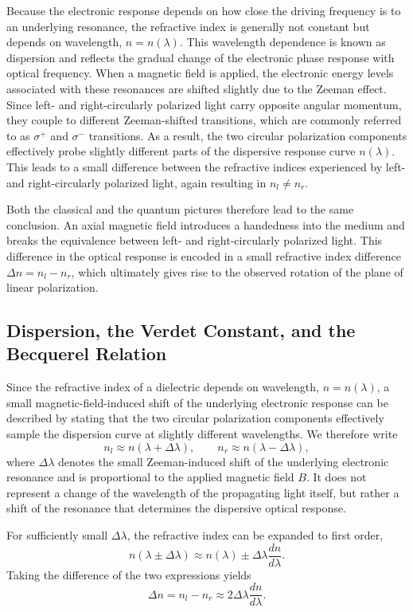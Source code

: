 \documentclass[a4paper]{article}
\begin{document}
Because the electronic response depends on how close the driving frequency is to an underlying resonance, the refractive index is generally not constant but depends on wavelength, $n = n(\lambda)$.
This wavelength dependence is known as dispersion and reflects the gradual change of the electronic phase response with optical frequency.
When a magnetic field is applied, the electronic energy levels associated with these resonances are shifted slightly due to the Zeeman effect.
Since left- and right-circularly polarized light carry opposite angular momentum, they couple to different Zeeman-shifted transitions, which are commonly referred to as $\sigma^+$ and $\sigma^-$ transitions.
As a result, the two circular polarization components effectively probe slightly different parts of the dispersive response curve $n(\lambda)$.
This leads to a small difference between the refractive indices experienced by left- and right-circularly polarized light, again resulting in $n_l \neq n_r$.

Both the classical and the quantum pictures therefore lead to the same conclusion.
An axial magnetic field introduces a handedness into the medium and breaks the equivalence between left- and right-circularly polarized light.
This difference in the optical response is encoded in a small refractive index difference $\Delta n = n_l - n_r$, which ultimately gives rise to the observed rotation of the plane of linear polarization.

\subsection{Dispersion, the Verdet Constant, and the Becquerel Relation}

Since the refractive index of a dielectric depends on wavelength, $n = n(\lambda)$, a small magnetic-field-induced shift of the underlying electronic response can be described by stating that the two circular polarization components effectively sample the dispersion curve at slightly different wavelengths.
We therefore write
\[
  n_l \approx n(\lambda + \Delta\lambda), \qquad n_r \approx n(\lambda - \Delta\lambda),
\]
where $\Delta\lambda$ denotes the small Zeeman-induced shift of the underlying electronic resonance and is proportional to the applied magnetic field $B$.
It does not represent a change of the wavelength of the propagating light itself, but rather a shift of the resonance that determines the dispersive optical response.

For sufficiently small $\Delta\lambda$, the refractive index can be expanded to first order,
\[
  n(\lambda \pm \Delta\lambda) \approx n(\lambda) \pm \Delta\lambda \frac{dn}{d\lambda}.
\]
Taking the difference of the two expressions yields
\[
  \Delta n = n_l - n_r \approx 2 \Delta\lambda \frac{dn}{d\lambda}.
\]
\end{document}
